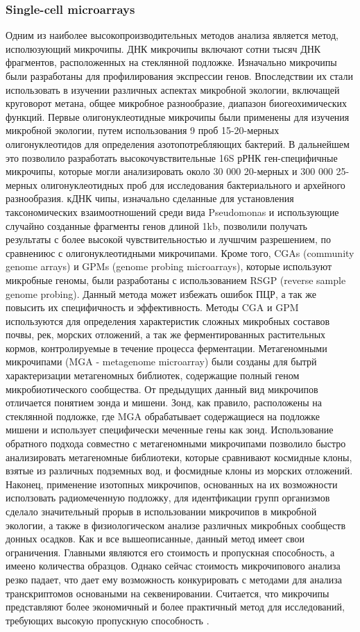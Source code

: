 \subsubsection{Single-cell microarrays}
Одним из наиболее высокопроизводительных методов анализа является метод, исполюзующий микрочипы. ДНК микрочипы включают сотни тысяч ДНК фрагментов, расположенных на стеклянной подложке. Изначально микрочипы были разработаны для профилирования экспрессии генов. Впоследствии их стали использовать в изучении различных
аспектах микробной экологии, включащей круговорот метана, общее микробное разнообразие, диапазон биогеохимических функций. Первые олигонуклеотидные микрочипы были
применены для изучения микробной экологии, путем использования 9 проб 15-20-мерных
олигонуклеотидов для определения азотопотребляющих бактерий. В дальнейшем это позволило разработать высокочувствительные 16S рРНК ген-специфичные
микрочипы, которые могли анализировать около 30 000 20-мерных и 300 000 25-мерных олигонуклеотидных проб для исследования бактериального и архейного разнообразия. кДНК
чипы, изначально сделанные для установления таксономических взаимоотношений среди
вида Pseudomonas и использующие случайно созданные фрагменты генов длиной 1kb, позволили получать результаты с более высокой чувствительностью и лучшчим разрешением,
по сравнениюс с олигонуклеотидными микрочипами. Кроме того, CGAs (community genome
arrays) и GPMs (genome probing microarrays), которые используют микробные геномы, были
разработаны с использованием RSGP (reverse sample genome probing). Данный метода может
избежать ошибок ПЦР, а так же повысить их специфичность и эффективность. Методы CGA
и GPM используются для определения характеристик сложных микробных составов почвы,
рек, морских отложений, а так же ферментированных растительных кормов, контролируемые в течение процесса ферментации. Метагеномными микрочипами (MGA - metagenome
microarray) были созданы для бытрй характеризации метагеномных библиотек, содержащие полный геном микробиотического сообщества. От предыдущих данный вид микрочипов
отличается понятием зонда и мишени. Зонд, как правило, расположены на стеклянной подложке, где MGA обрабатывает содержащиеся на подложке мишени и использует специфически меченные гены как зонд. Использование обратного подхода совместно с метагеномными
микрочипами позволило быстро анализировать метагеномные библиотеки, которые сравнивают космидные клоны, взятые из различных подземных вод, и фосмидные клоны
из морских отложений. Наконец, применение изотопных микрочипов, основанных на их возможности исползовать радиомеченную подложку, для идентфикации групп организмов сделало значительный прорыв в использовании микрочипов в микробной экологии, а также
в физиологическом анализе различных микробных сообществ донных осадков. Как и все вышеописанные, данный метод имеет свои ограничения. Главными являются его стоимость и пропускная способность, а имеено количества образцов. Однако сейчас
стоимость микрочипового анализа резко падает, что дает ему возможность конкурировать
с методами для анализа транскриптомов основаными на секвенировании. Считается, что
микрочипы представляют более экономичный и более практичный метод для исследований,
требующих высокую пропускную способность \cite{Roh2010}.

